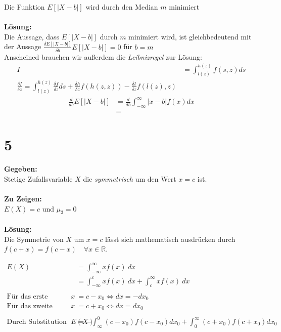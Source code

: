 \documentclass{article}
\begin{document}
Die Funktion $E[|X-b|]$ wird durch den Median $m$ minimiert\\\\
\textbf{Lösung:}\\

Die Aussage, dass $E[|X-b|]$ durch $m$ minimiert wird, ist gleichbedeutend mit der Aussage $\frac{\delta E[|X- b|]}{\delta b} E[|X-b|] = 0$ für $ b = m$ \\

Anscheined brauchen wir außerdem die \textit{Leibnizregel} zur Lösung: 
\begin{align*}
    I &= \int_{l(z)}^{h(z)} f(s, z) ds \\
    \frac{\delta I}{\delta z} = \int_{l(z)}^{h(z)} \frac{\delta f}{\delta z} ds + \frac{\delta h}{\delta z} f(h(z, z)) - \frac{\delta l}{\delta z} f(l(z), z)
\end{align*}
\begin{align*}
    \frac{d}{d b}E[|X-b|] &= \frac{d}{d b}  \int_{-\infty}^{\infty} |x-b|  f(x) dx \\ 
    &= 
\end{align*}
\section*{5}
\textbf{Gegeben:}\\

Stetige Zufallsvariable $X$ die \textit{symmetrisch} um den Wert $x = c$ ist.\\ \\
\textbf{Zu Zeigen:}\\

$E(X) = c $ und $\mu_3 = 0$ \\\\
\textbf{Lösung:}\\

Die Symmetrie von $X$ um $x = c$ lässt sich mathematisch ausdrücken durch $f(c + x) = f(c-x) \quad \forall x \in \mathbb{R} $.

\begin{align*}
    E(X) &= \int_{-\infty}^{\infty} x f(x) ~ dx     \\
    &= \int_{-\infty}^{c} x f(x) ~ dx + \int_{c}^{\infty} x f(x) ~ dx \tag*{Unabhängig von Symmetrie}\\ \\
    \text{Für das erste Integral: } x &= c - x_0 \Leftrightarrow dx = -dx_0 \\
    \text{Für das zweite Integral: } x &= c + x_0  \Leftrightarrow dx = dx_0  \\ \\
    \text{Durch Substitution ergibt sich: } E(X) &= - \int_{\infty}^{0} (c - x_0) f(c-x_0)dx_0 + \int_{0}^{\infty} (c + x_0) f(c + x_0) dx_0
\end{align*}
\end{document}
